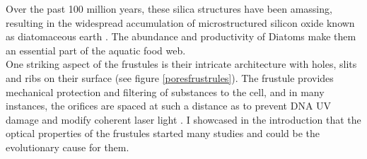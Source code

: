 \documentclass[letterpaper,12pt,oneside]{book}
\begin{document}
Over the past 100 million years, these silica structures have been amassing, resulting in the widespread accumulation of microstructured silicon oxide known as diatomaceous earth \cite{aguirre2018diatomDNAViolet}. The abundance and productivity of Diatoms make them an essential part of the aquatic food web. 
\\\noindent 
One striking aspect of the frustules is their intricate architecture with holes, slits and ribs on their surface (see figure \ref{poresfrustrules}). The frustule provides mechanical protection and filtering of substances to the cell, and in many instances, the orifices are spaced at such a distance as to prevent DNA UV damage and modify coherent laser light \cite{aguirre2018diatomDNAViolet,de2007lensless}. I showcased in the introduction that the optical properties of the frustules started many studies and could be the evolutionary cause for them.
\end{document}
